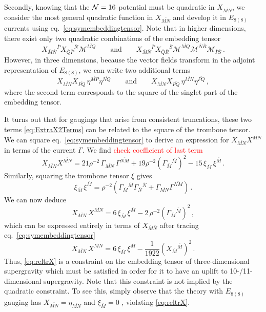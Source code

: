 \documentclass[a4paper, 11pt]{article}
\numberwithin{equation}{section}
\newcommand{\ov}[1]{\overline{#1}}
\newcommand{\EE}{\ensuremath{E_{8(8)}}\xspace}
\newcommand{\En}[1]{E_{#1(#1)}}
\newcommand{\+}{\oplus}
\newcommand{\gM}{\mathcal{M}}
\newcommand{\fl}[1]{\ov{#1}}
\newcommand{\EM}[1]{\textcolor{red}{#1}}
\begin{document}
Secondly, knowing that the ${\cal N}=16$ potential must be quadratic in $X_{\fl{MN}}$, we consider the most general quadratic function in $X_{\fl{MN}}$ and develop it in \EE currents using eq.~\eqref{eq:symembeddingtensor}. Note that in higher dimensions, there exist only two quadratic combinations of the embedding tensor
\begin{equation}
	X_{\fl{M}\fl{N}}{}^{\fl{P}} X_{\fl{Q}\fl{P}}{}^{\fl{N}} \gM^{\fl{MQ}} \qquad \text{and} \qquad X_{\fl{M}\fl{N}}{}^{\fl{P}} X_{\fl{Q}\fl{R}}{}^{\fl{S}} \gM^{\fl{MQ}} \gM^{\fl{N}\fl{R}} \gM_{\fl{P}\fl{S}} \,.
\end{equation}
However, in three dimensions, because the vector fields transform in the adjoint representation of $\EE$, we can write two additional terms
\begin{equation} \label{eq:ExtraX2Terms}
	X_{\fl{MN}} X_{\fl{PQ}}\, \eta^{\fl{MP}} \eta^{\fl{NQ}} \qquad \text{and} \qquad X_{\fl{MN}} X_{\fl{PQ}}\, \eta^{\fl{MN}} \eta^{\fl{PQ}} \,,
\end{equation}
where the second term corresponds to the square of the singlet part of the embedding tensor.

It turns out that for gaugings that arise from consistent truncations, these two terms \eqref{eq:ExtraX2Terms} can be related to the square of the trombone tensor. We can square eq.~\eqref{eq:symembeddingtensor} to derive an expression for $X_{\ov{MN}}X^{\ov{MN}}$ in terms of the current $\Gamma$. We find \EM{check coefficient of last term}
\begin{equation}\label{eq:XXwitheta}
	X_{\ov{MN}}X^{\ov{MN}} = 21 \rho^{-2}\, \Gamma_{\ov{MN}}\, \Gamma^{\ov{NM}} + 19 \rho^{-2}\left(\Gamma_{\ov M}{}^{\ov M}\right)^2 - 15\, \xi_{\ov{M}}\, \xi^{\ov{M}} \,.
\end{equation}
Similarly, squaring the trombone tensor $\xi$ gives
\begin{equation}\label{eq:xixiwitheta}
	\xi_{\ov M}\,\xi^{\ov M}=\rho^{-2}\left(\Gamma_{\ov M}{}^{\ov M}\Gamma_{\ov N}{}^{\ov N}+\Gamma_{\ov{MN}}\Gamma^{\ov{NM}}\right) \,.
\end{equation}
We can now deduce
\begin{equation}
	X_{\ov{MN}} \,X^{\ov{MN}}= 6\, \xi_{\ov M} \, \xi^{\ov M} - 2\, \rho^{-2}\left(\Gamma_{\ov M}{}^{\ov M}\right)^2 \,,
\end{equation}
which can be expressed entirely in terms of $X_{\fl{M}\fl{N}}$ after tracing eq.~\eqref{eq:symembeddingtensor}
\begin{equation}\label{eq:reltrX}
	X_{\ov{MN}}\,X^{\ov{MN}} = 6\, \xi_{\ov M}\, \xi^{\ov M} - \frac1{1922}\left(X_{\ov M}{}^{\ov M}\right)^2 \,. 
\end{equation}
Thus, \eqref{eq:reltrX} is a constraint on the embedding tensor of three-dimensional supergravity which must be satisfied in order for it to have an uplift to 10-/11-dimensional supergravity. Note that this constraint is not implied by the quadratic constraint. To see this, simply observe that the theory with $\En{8}$ gauging has $X_{\ov{MN}}=\eta_{\ov{MN}}$ and $\xi_{\fl{M}} = 0$ \cite{Nicolai:2000sc,Nicolai:2001sv}, violating \eqref{eq:reltrX}.
\end{document}

